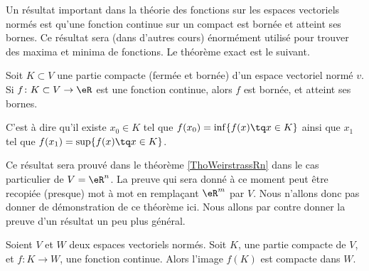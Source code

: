 Un résultat important dans la théorie des fonctions sur les espaces vectoriels normés est qu'une fonction continue sur un compact est bornée et atteint ses bornes. Ce résultat sera (dans d'autres cours) énormément utilisé pour trouver des maxima et minima de fonctions. Le théorème exact est le suivant.

\begin{theorem}		\label{WeierstrassEVN}
	Soit $K\subset V$ une partie compacte (fermée et bornée) d'un espace vectoriel normé $v$. Si $f\colon K\subset V\to \eR$ est une fonction continue, alors $f$ est bornée, et atteint ses bornes. 
	
	C'est à dire qu'il existe $x_0\in K$ tel que $f(x_0)=\inf\{ f(x)\tq x\in K \}$ ainsi que $x_1$ tel que $f(x_1)=\sup\{ f(x)\tq x\in K \}$.
\end{theorem}

Ce résultat sera prouvé dans le théorème \ref{ThoWeirstrassRn} dans le cas particulier de $V=\eR^n$. La preuve qui sera donné à ce moment peut être recopiée (presque) mot à mot en remplaçant $\eR^m$ par $V$. Nous n'allons donc pas donner de démonstration de ce théorème ici. Nous allons par contre donner la preuve d'un résultat un peu plus général.

\begin{proposition}		\label{PropContinueCompactBorne}
	Soient $V$ et $W$ deux espaces vectoriels normés. Soit $K$, une partie compacte de $V$, et $f\colon K\to W$, une fonction continue. Alors l'image $f(K)$ est compacte dans $W$.
\end{proposition}

